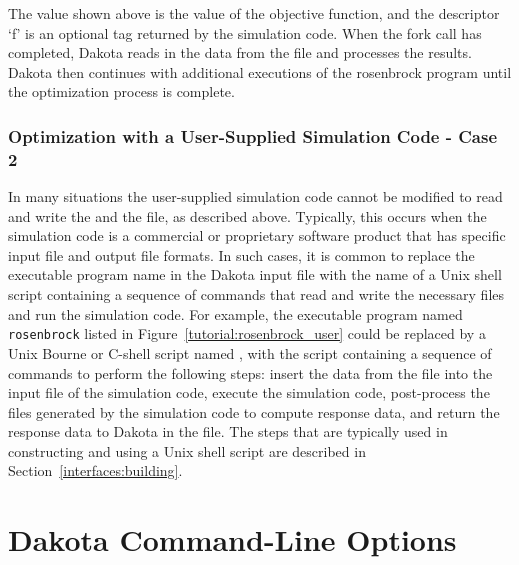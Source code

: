 The value shown above is the value of the objective function, and the
descriptor `f' is an optional tag returned by the simulation code.
When the fork call has completed, Dakota reads in the data from the
 file and processes the results. Dakota then
continues with additional executions of the rosenbrock program until
the optimization process is complete.

\subsubsection{Optimization with a User-Supplied Simulation Code - Case 2}\label{tutorial:examples:user_supply:optimization2}

In many situations the user-supplied simulation code cannot be
modified to read and write the  and the
 file, as described above. Typically, this
occurs when the simulation code is a commercial or proprietary
software product that has specific input file and output file formats.
In such cases, it is common to replace the executable program name in
the Dakota input file with the name of a Unix shell script containing
a sequence of commands that read and write the necessary files and run
the simulation code. For example, the executable program named
\texttt{rosenbrock} listed in Figure~\ref{tutorial:rosenbrock_user}
could be replaced by a Unix Bourne or C-shell script named
, with the script containing a sequence of
commands to perform the following steps: insert the data from the
 file into the input file of the simulation
code, execute the simulation code, post-process the files generated by
the simulation code to compute response data, and return the response
data to Dakota in the  file. The steps that are
typically used in constructing and using a Unix shell script are
described in Section~\ref{interfaces:building}.

\section{Dakota Command-Line Options}\label{tutorial:installation:running}

